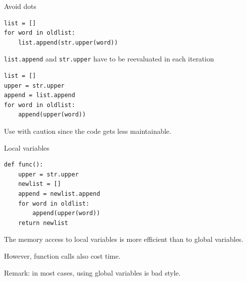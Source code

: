\documentclass[t,handout]{beamer}
\begin{document}
\begin{frame}[c,fragile]{Avoid dots}

\begin{verbatim}
list = []
for word in oldlist:
    list.append(str.upper(word))
\end{verbatim}

\texttt{list.append} and \texttt{str.upper} have to be reevaluated in each iteration

\pause
\medskip

\begin{verbatim}
list = []
upper = str.upper
append = list.append
for word in oldlist:
    append(upper(word))
\end{verbatim}

Use with caution since the code gets less maintainable.


\end{frame}
\begin{frame}[c,fragile]{Local variables}

\begin{verbatim}
def func():
    upper = str.upper
    newlist = []
    append = newlist.append
    for word in oldlist:
        append(upper(word))
    return newlist
\end{verbatim}

The memory access to local variables is more efficient than to global variables.

\smallskip
However, function calls also cost time.

\smallskip
Remark: in most cases, using global variables is bad style. 

\end{frame}
\end{document}
